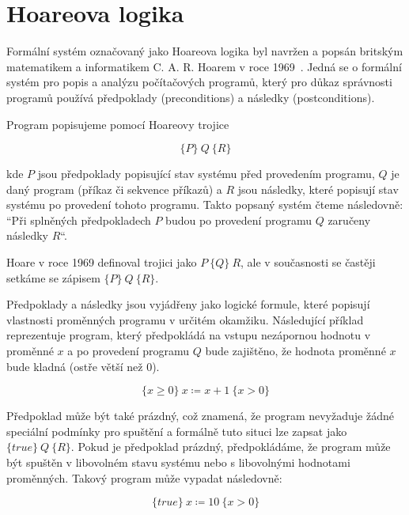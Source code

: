 \chapter{Hoareova logika}
\label{ch:hoareova-logika}

Formální systém označovaný jako Hoareova logika byl navržen a popsán
britským matematikem a informatikem C. A. R. Hoarem v roce 1969~\cite{Hoare1969}.
Jedná se o formální systém pro popis a analýzu počítačových programů,
který pro důkaz správnosti programů používá předpoklady (preconditions) a následky (postconditions).

Program popisujeme pomocí Hoareovy trojice

\begin{equation*}
    \{P\} \  Q \  \{R\}
\end{equation*}

kde $P$ jsou předpoklady popisující stav systému před provedením programu,
$Q$ je daný program (příkaz či sekvence příkazů)
a $R$ jsou následky, které popisují stav systému po provedení tohoto programu.
Takto popsaný systém čteme následovně:
``Při splněných předpokladech $P$ budou po provedení programu $Q$ zaručeny následky $R$``.

Hoare v roce 1969 definoval trojici jako $P \ \{ Q \} \  R$,
ale v současnosti se častěji setkáme se zápisem $\{ P \} \  Q \ \{ R \}$.

Předpoklady a následky jsou vyjádřeny jako logické formule,
které popisují vlastnosti proměnných programu v určitém okamžiku.
Následující příklad reprezentuje program, který předpokládá na vstupu nezápornou hodnotu v proměnné $x$
a po provedení programu $Q$ bude zajištěno, že hodnota proměnné $x$ bude kladná (ostře větší než 0).

\begin{equation*}
    \{ x \geq 0 \} \  x \coloneqq x + 1 \  \{ x > 0 \}
\end{equation*}

Předpoklad může být také prázdný, což znamená, že program nevyžaduje žádné speciální podmínky pro spuštění
a formálně tuto situci lze zapsat jako $\{ true \} \  Q \  \{ R \}$.
Pokud je předpoklad prázdný, předpokládáme, že program může být spuštěn
v libovolném stavu systému nebo s libovolnými hodnotami proměnných.
Takový program může vypadat následovně:

\begin{equation*}
    \{ true \} \  x \coloneqq 10 \  \{ x > 0 \}
\end{equation*}

